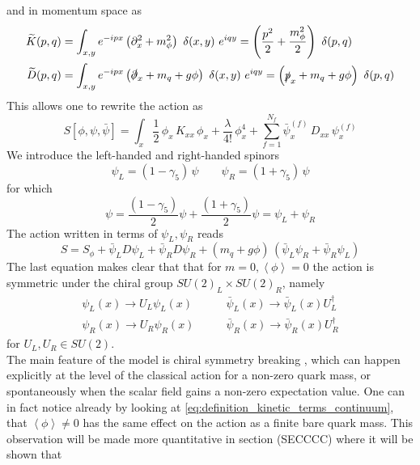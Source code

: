and in momentum space as
\begin{equation}
    \begin{aligned}
        \widetilde{K}(p, q) &=  \int_{x,y} e^{-ipx} \left(\partial^2_x + m_\phi^2\right) \ \delta(x,y) \ e^{iqy} = \left(\frac{p^2}{2} + \frac{m_\phi^2}{2}\right) \ \delta(p,q) \\
        \widetilde{D}(p, q) &= \int_{x,y} e^{-ipx} \left(\slashed{\partial}_x + m_q + g\phi \right) \ \delta(x,y) \ e^{iqy} = \left(\slashed{p}_x + m_q + g\phi \right) \ \delta(p,q)
    \end{aligned}
    \label{eq:definition_kinetic_terms_continuum_momentum}
\end{equation}
This allows one to rewrite the action as
\begin{equation*}
    S[\phi,\psi,\bar\psi] = \int_x \frac{1}{2} \, \phi_x \, K_{xx} \, \phi_x + \frac{\lambda}{4!} \, \phi_x^4 + \sum_{f=1}^{N_f} \bar\psi_x^{(f)} \, D_{xx} \, \psi_x^{(f)}
\end{equation*}
We introduce the left-handed and right-handed spinors
\begin{equation*}
	\psi_L = (1-\gamma_5) \, \psi \qquad \psi_R = (1+\gamma_5) \, \psi
\end{equation*}
for which
\begin{equation*}
	\psi = \frac{(1-\gamma_5)}{2} \psi + \frac{(1+\gamma_5)}{2} \psi = \psi_L + \psi_R
\end{equation*}
The action written in terms of $\psi_L, \psi_R$ reads
\begin{equation}
	S = S_\phi +  \bar\psi _L D \psi_L + \bar\psi _R D \psi_R + (m_q + g\phi) \,  \left(\bar\psi_L\psi_R + \bar\psi_R\psi_L\right)
	\label{eq:action_chirality_explicit}
\end{equation}
The last equation makes clear that that for $m=0,\left\langle\phi\right\rangle = 0$ the action is symmetric under the chiral group $SU(2) _L\times SU(2)_R$, namely
\begin{equation*}
	\begin{aligned}
		\psi_L(x) \to U_L\psi_L(x) &\qquad \bar\psi_L(x) \to \bar\psi_L(x) U_L^{\dagger} \\
		 \psi_R(x) \to U_R\psi_R(x) &\qquad \bar\psi_R(x) \to \bar\psi_R(x) U_R^{\dagger}
	\end{aligned}
\end{equation*}
for $U_L, U_R \in SU(2)$.\\
The main feature of the model is chiral symmetry breaking \cite{Nambu1961DynamicalI, Nambu1961DynamicalII}, which can happen explicitly at the level of the classical action for a non-zero quark mass, or spontaneously when the scalar field gains a non-zero expectation value. One can in fact notice already by looking at \eqref{eq:definition_kinetic_terms_continuum}, that $\left\langle\phi\right\rangle \neq 0$ has the same effect on the action as a finite bare quark mass. This observation will be made more quantitative in section (SECCCC) where it will be shown that  
